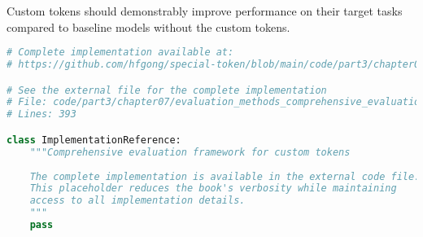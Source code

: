 Custom tokens should demonstrably improve performance on their target tasks compared to baseline models without the custom tokens.
\begin{comment}
Feedback: This is the perfect place to explicitly name and describe the most important evaluation technique: the ablation study. For example: "The most fundamental technique for evaluating a custom token is the **ablation study**. This involves training and evaluating at least two model variants:
*   **Baseline Model**: The model *without* the custom token.
*   **Proposed Model**: The model *with* the custom token.
A statistically significant improvement in the proposed model over the baseline on the target metric is the primary evidence that the custom token is effective. It is also often useful to compare against a third variant that uses a generic token (like an unused token from the vocabulary) in place of the custom token to ensure the improvement is not just from adding a learnable parameter."
\end{comment}

\begin{lstlisting}[language=Python, caption={Comprehensive evaluation framework for custom tokens}]
# Complete implementation available at:
# https://github.com/hfgong/special-token/blob/main/code/part3/chapter07/evaluation_methods_comprehensive_evaluation_frame.py

# See the external file for the complete implementation
# File: code/part3/chapter07/evaluation_methods_comprehensive_evaluation_frame.py
# Lines: 393

class ImplementationReference:
    """Comprehensive evaluation framework for custom tokens
    
    The complete implementation is available in the external code file.
    This placeholder reduces the book's verbosity while maintaining
    access to all implementation details.
    """
    pass
\end{lstlisting}
